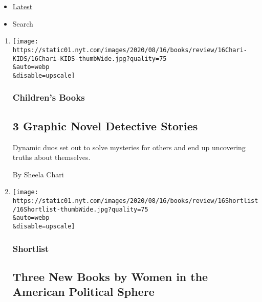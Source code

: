 \begin{itemize}
\tightlist
\item
  \protect\hyperlink{stream-panel}{Latest}
\item
  Search
\end{itemize}

\begin{enumerate}
\def\labelenumi{\arabic{enumi}.}
\item
  \href{/2020/08/08/books/review/drew-dernavich-elvin-link-please-report-to-the-principals-office.html}{}

  \texttt{[image: https://static01.nyt.com/images/2020/08/16/books/review/16Chari-KIDS/16Chari-KIDS-thumbWide.jpg?quality=75\\\&auto=webp\\\&disable=upscale]}

  \hypertarget{childrens-books}{%
  \subsubsection{Children's Books}\label{childrens-books}}

  \hypertarget{3-graphic-novel-detective-stories}{%
  \subsection{3 Graphic Novel Detective
  Stories}\label{3-graphic-novel-detective-stories}}

  Dynamic duos set out to solve mysteries for others and end up
  uncovering truths about themselves.

  By Sheela Chari
\item
  \href{/2020/08/08/books/review/katie-hill-she-will-rise-ilhan-omar-tiffany-cross.html}{}

  \texttt{[image: https://static01.nyt.com/images/2020/08/16/books/review/16Shortlist/16Shortlist-thumbWide.jpg?quality=75\\\&auto=webp\\\&disable=upscale]}

  \hypertarget{shortlist}{%
  \subsubsection{Shortlist}\label{shortlist}}

  \hypertarget{three-new-books-by-women-in-the-american-political-sphere}{%
  \subsection{Three New Books by Women in the American Political
  Sphere}\label{three-new-books-by-women-in-the-american-political-sphere}}


\end{enumerate}
